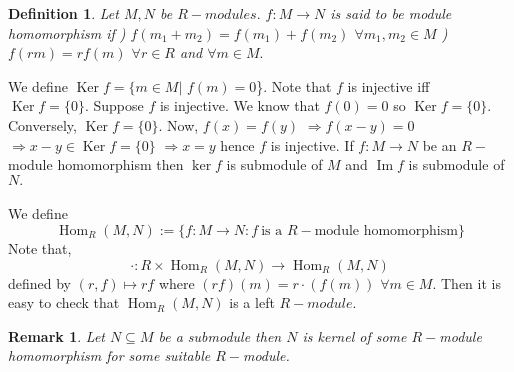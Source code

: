\documentclass[11pt]{amsart}
\newtheorem{definition}[theorem]{Definition}%
\newtheorem*{remark*}{Remark}
\DeclareMathOperator{\im}{\text{Im}}
\begin{document}
\begin{definition}
Let $M,N$ be $R-modules.$ $f:M \rightarrow N$ is said to be module homomorphism if 
) $f(m_{1}+m_{2})=f(m_{1})+f(m_{2})$ $\forall m_{1},m_{2} \in M$
) $f(rm)=rf(m)$ $\forall r\in R$ and $\forall m\in M.$
\end{definition}
We define $\operatorname{Ker}f=\{m\in M|$ $f(m)=0$\}. Note that $f$ is injective iff $\operatorname{Ker}f=\{0\}.$ Suppose $f$ is injective. We know that $f(0)=0$ so $\operatorname{Ker}f=\{0\}.$ Conversely, $\operatorname{Ker}f=\{0\}.$ Now, $f(x)=f(y)$ $\Rightarrow f(x-y)=0$ $\Rightarrow x-y \in \operatorname{Ker}f=\{0\}$ $\Rightarrow x=y$ hence $f$ is injective. If $f:M\to N$ be an $R-$module homomorphism then $\ker f$ is submodule of $M$ and $\im f$ is submodule of $N.$\\\\
We define $$\operatorname{Hom}_{R}(M,N):=\{f:M\rightarrow N:f~\text{is a $R-$module homomorphism}\}$$
\newline Note that, $$\cdot : R\times \operatorname{Hom}_{R}(M,N)\rightarrow \operatorname{Hom}_{R}(M,N)$$ defined by $(r,f)\mapsto rf$ where $(rf)(m)=r\cdot (f(m))$ $\forall m\in M.$ Then it is easy to check that $\operatorname{Hom}_{R}(M,N)$ is a left $R-module.$
\begin{remark*}
Let $N\subseteq M$ be a submodule then $N$ is kernel of some $R-$module homomorphism for some suitable $R-$module.
\end{remark*}
\end{document}
